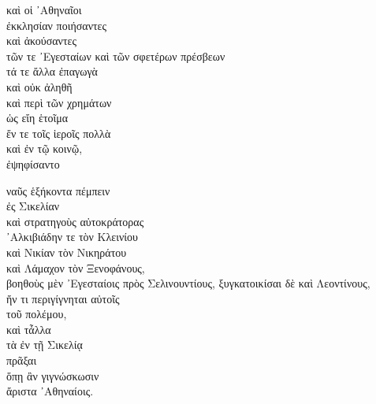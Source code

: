 

{\large
\noindent καὶ οἱ ᾿Αθηναῖοι \\
\tabto{2em} ἐκκλησίαν ποιήσαντες \\
\tabto{2em} καὶ ἀκούσαντες \\
\tabto{4em} τῶν τε ᾿Εγεσταίων καὶ τῶν σφετέρων πρέσβεων\\
\tabto{2em} τά τε ἄλλα ἐπαγωγὰ \\
\tabto{2em} καὶ οὐκ ἀληθῆ \\
\tabto{2em} καὶ περὶ τῶν χρημάτων\\
\tabto{4em}  ὡς εἴη ἑτοῖμα \\
\tabto{6em}  ἔν τε τοῖς ἱεροῖς πολλὰ \\
\tabto{6em} καὶ ἐν τῷ κοινῷ,\\
ἐψηφίσαντο

\tabto{2em} ναῦς ἑξήκοντα πέμπειν \\
\tabto{4em} ἐς Σικελίαν \\
\tabto{2em} καὶ στρατηγοὺς αὐτοκράτορας \\
\tabto{4em} ᾿Αλκιβιάδην τε τὸν Κλεινίου \\
\tabto{4em} καὶ Νικίαν τὸν Νικηράτου \\
\tabto{4em} καὶ Λάμαχον τὸν Ξενοφάνους, \\
\tabto{2em} βοηθοὺς μὲν ᾿Εγεσταίοις πρὸς Σελινουντίους,
\tabto{2em} ξυγκατοικίσαι δὲ καὶ Λεοντίνους, \\
\tabto{4em} ἤν τι περιγίγνηται αὐτοῖς \\
\tabto{6em} τοῦ πολέμου, \\
\tabto{3em} καὶ τἆλλα \\
\tabto{6em} τὰ ἐν τῇ Σικελίᾳ \\
\tabto{2em} πρᾶξαι \\
\tabto{4em} ὅπῃ ἂν γιγνώσκωσιν \\
\tabto{6em} ἄριστα ᾿Αθηναίοις.\\

}

